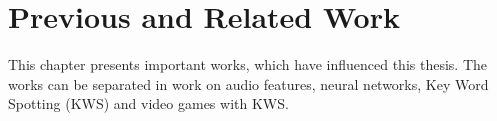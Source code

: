 
\chapter{Previous and Related Work}\label{sec:prev}
\thesisStateRevised
This chapter presents important works, which have influenced this thesis.
The works can be separated in work on audio features, neural networks, Key Word Spotting (KWS) and video games with KWS.







